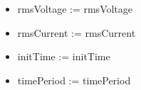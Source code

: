 \documentclass{article}
\begin{document}
\begin{itemize}	%
\item \acrshort{rmsVoltage} := \acrlong{rmsVoltage} 				%
\item \acrshort{rmsCurrent} := \acrlong{rmsCurrent} 				%
\item \acrshort{initTime} := \acrlong{initTime}												%
\item \acrshort{timePeriod} := \acrlong{timePeriod}											%
\end{itemize}	%

\clearpage
\setcounter{page}{1}

\printglossary[type=\acronymtype,nonumberlist,title={Variables}]
\clearpage
\glsaddall
\printglossary[nonumberlist]
\clearpage
\printindex
\clearpage
\end{document}
